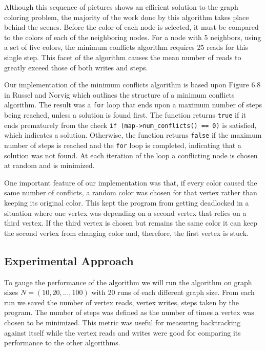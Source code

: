 \documentclass{article}
\begin{document}
		Although this sequence of pictures shows an efficient solution to the graph coloring problem, the majority of the work done by this algorithm takes place behind the scenes.  Before the color of each node is selected, it must be compared to the colors of each of the neighboring nodes.  For a node with 5 neighbors, using a set of five colors, the minimum conflicts algorithm requires 25 reads for this single step.  This facet of the algorithm causes the mean number of reads to greatly exceed those of both writes and steps.

		Our implementation of the minimum conflicts algorithm is based upon Figure 6.8 in Russel and Norvig \cite{ai} which outlines the structure of a minimum conflicts algorithm. The result was  a \texttt{for} loop that ends upon a maximum number of steps being reached, unless a solution is found first.  The function returns \texttt{true} if it ends prematurely from the check \texttt{if (map->num\_conflicts() == 0)} is satisfied, which indicates a solution.  Otherwise, the function returns \texttt{false} if the maximum number of steps is reached and the \texttt{for} loop is completed, indicating that a solution was not found. At each iteration of the loop a conflicting node is chosen at random and is minimized.
		
		One important feature of our implementation was that, if every color caused the same number of conflicts, a random color was chosen for that vertex rather than keeping its original color. This kept the program from getting deadlocked in a situation where one vertex was depending on a second vertex that relies on a third vertex. If the third vertex is chosen but remains the same color it can keep the second vertex from changing color and, therefore, the first vertex is stuck. 
		
		

	\subsection{Experimental Approach}
	To gauge the performance of the algorithm we will run the algorithm on graph sizes $N = (10, 20, ..., 100)$ with 20 runs of each different graph size. From each run we saved the number of vertex reads, vertex writes, steps taken by the program. The number of steps was defined as the number of times a vertex was chosen to be minimized. This metric was useful for measuring backtracking against itself while the vertex reads and writes were good for comparing its performance to the other algorithms.
	
\end{document}
